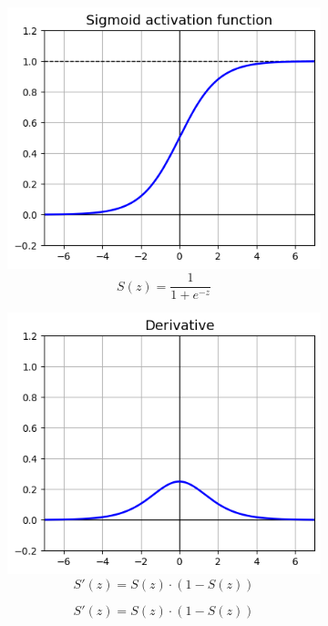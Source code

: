 \begin{figure}[H]
  \centering
  \begin{subfigure}{0.5\textwidth}
      \centering
      \includegraphics[width=0.9\linewidth]{fig/actfunc_sigmoid.png}
      \caption{%
          \begin{equation}
              S(z) = \frac{1} {1 + e^{-z}}
          \end{equation}
      }
      \label{fig:actfunc_sigmoid}
  \end{subfigure}%
  \begin{subfigure}{0.5\textwidth}
      \centering
      \includegraphics[width=0.9\linewidth]{fig/actfunc_sigmoid_der.png}
      \caption{%
          \begin{equation}
              S'(z) = S(z) \cdot (1 - S(z))
          \end{equation}
      }
      \label{fig:actfunc_sigmoid_der}
  \end{subfigure}
\end{figure}

